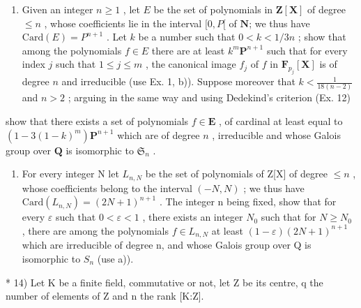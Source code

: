\begin{enumerate}
\def\labelenumi{\alph{enumi})}
\tightlist
\item
  Given an integer \(n \geqslant 1\) , let \(E\) be the set of polynomials in \(\mathbf{Z}[\mathbf{X}]\) of degree \(\leqslant n\) , whose coefficients lie in the interval \([0, P[\) of \(\mathbf{N}\); we thus have \(\text{Card}(E) = P^{n+1}\) . Let \(k\) be a number such that \(0 < k < 1/3n\) ; show that among the polynomials \(f \in E\) there are at least \(k^m\mathbf{P}^{n + 1}\) such that for every index \(j\) such that \(1 \leqslant j \leqslant m\) , the canonical image \(f_j\) of \(f\) in \(\mathbf{F}_{p_j}[\mathbf{X}]\) is of degree \(n\) and irreducible (use Ex. 1, b)). Suppose moreover that \(k < \frac{1}{18(n - 2)}\) and \(n > 2\) ; arguing in the same way and using Dedekind's criterion (Ex. 12)
\end{enumerate}

show that there exists a set of polynomials \(f \in \mathbf{E}\) , of cardinal at least equal to \((1 - 3(1 - k)^m) \mathbf{P}^{n+1}\) which are of degree \(n\) , irreducible and whose Galois group over \(\mathbf{Q}\) is isomorphic to \(\mathfrak{S}_n\) .

\begin{enumerate}
\def\labelenumi{\alph{enumi})}
\setcounter{enumi}{1}
\tightlist
\item
  For every integer N let \(L_{n,N}\) be the set of polynomials of Z{[}X{]} of degree \(\leqslant n\) , whose coefficients belong to the interval \((-N, N)\) ; we thus have \(\text{Card}(L_{n,N}) = (2N + 1)^{n+1}\) . The integer n being fixed, show that for every \(\varepsilon\) such that \(0 < \varepsilon < 1\) , there exists an integer \(N_0\) such that for \(N \geqslant N_0\) , there are among the polynomials \(f \in L_{n,N}\) at least \((1 - \varepsilon)(2N + 1)^{n+1}\) which are irreducible of degree n, and whose Galois group over Q is isomorphic to \(S_n\) (use a)).
\end{enumerate}

* 14) Let K be a finite field, commutative or not, let Z be its centre, q the number of elements of Z and n the rank {[}K:Z{]}.

